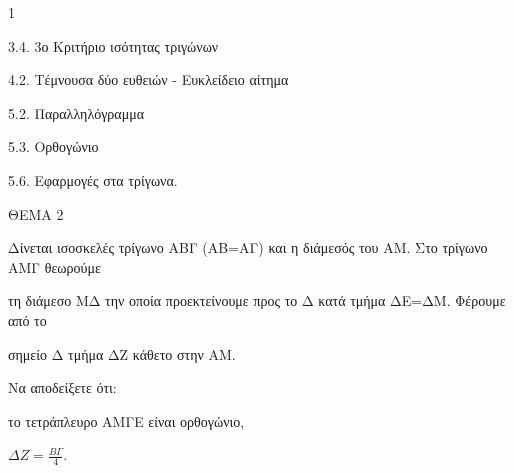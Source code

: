 \begin{ylh}{1}
    \item 3.4. 3ο Κριτήριο ισότητας τριγώνων
    \item 4.2. Τέμνουσα δύο ευθειών - Ευκλείδειο αίτημα
    \item 5.2. Παραλληλόγραμμα
    \item 5.3. Ορθογώνιο
    \item 5.6. Εφαρμογές στα τρίγωνα.
\end{ylh}

ΘΕΜΑ 2

Δίνεται ισοσκελές τρίγωνο ΑΒΓ (ΑΒ=ΑΓ) και η διάμεσός του ΑΜ. Στο τρίγωνο ΑΜΓ θεωρούμε

τη διάμεσο ΜΔ την οποία προεκτείνουμε προς το Δ κατά τμήμα ΔΕ=ΔΜ. Φέρουμε από το

σημείο Δ τμήμα ΔΖ κάθετο στην ΑΜ.

Να αποδείξετε ότι:

\begin{alist}
\item το τετράπλευρο ΑΜΓΕ είναι ορθογώνιο, 

\item $\Delta Z = \frac{B\Gamma}{4}$. 

\begin{center}
\end{center}


\end{alist}
